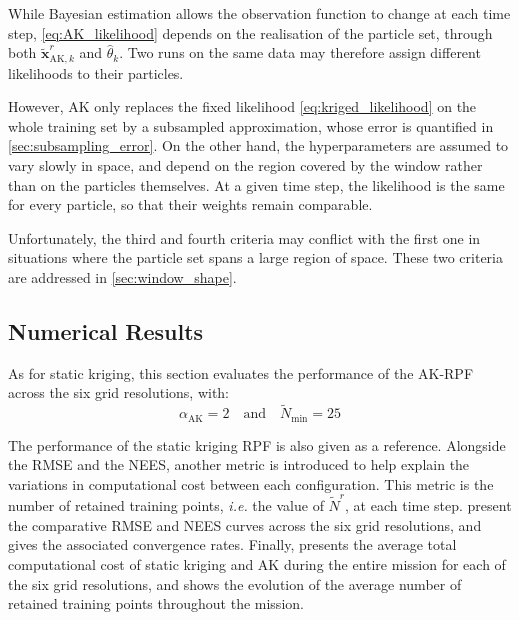 \begin{remark}\label{th:AK_particle_set}
	While Bayesian estimation allows the observation function to change at each time step, \eqref{eq:AK_likelihood} depends on the realisation of the particle set, through both $\tilde{\mathbf{x}}_{\mathrm{AK},k}^r$ and $\hat{\theta}_k$. Two runs on the same data may therefore assign different likelihoods to their particles.

	However, AK only replaces the fixed likelihood \eqref{eq:kriged_likelihood} on the whole training set by a subsampled approximation, whose error is quantified in \cref{sec:subsampling_error}. On the other hand, the hyperparameters are assumed to vary slowly in space, and depend on the region covered by the window rather than on the particles themselves. At a given time step, the likelihood is the same for every particle, so that their weights remain comparable.
\end{remark}

Unfortunately, the third and fourth criteria may conflict with the first one in situations where the particle set spans a large region of space. These two criteria are addressed in \cref{sec:window_shape}.

\subsection{Numerical Results}

As for static kriging, this section evaluates the performance of the AK-RPF across the six grid resolutions, with:
\begin{equation}
\alpha_{\mathrm{AK}}=2\quad\text{and}\quad\tilde{N}_{\min}=25
\end{equation}

The performance of the static kriging RPF is also given as a reference. Alongside the RMSE and the NEES, another metric is introduced to help explain the variations in computational cost between each configuration. This metric is the number of retained training points, \textit{i.e.} the value of $\tilde{N}^r$, at each time step.  present the comparative RMSE and NEES curves across the six grid resolutions, and  gives the associated convergence rates. Finally,  presents the average total computational cost of static kriging and AK during the entire mission for each of the six grid resolutions, and  shows the evolution of the average number of retained training points throughout the mission.

